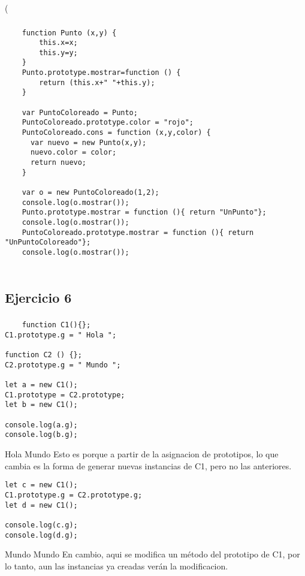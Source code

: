 \left( \documentclass[10pt,a4paper]{article}
\begin{document}
\subsubsection{}
    \begin{lstlisting}
    function Punto (x,y) {
    	this.x=x;
    	this.y=y;
    }
    Punto.prototype.mostrar=function () {
    	return (this.x+" "+this.y);
    }
    
    var PuntoColoreado = Punto;
    PuntoColoreado.prototype.color = "rojo";
    PuntoColoreado.cons = function (x,y,color) {
      var nuevo = new Punto(x,y);
      nuevo.color = color;
      return nuevo;
    }

    var o = new PuntoColoreado(1,2);
    console.log(o.mostrar());
    Punto.prototype.mostrar = function (){ return "UnPunto"};
    console.log(o.mostrar());
    PuntoColoreado.prototype.mostrar = function (){ return "UnPuntoColoreado"};
    console.log(o.mostrar());
    \end{lstlisting}
\subsubsection{}
    \begin{lstlisting}
    \end{lstlisting}
\subsection{Ejercicio 6}
\subsubsection{}
    \begin{lstlisting}
    function C1(){};
C1.prototype.g = " Hola ";

function C2 () {};
C2.prototype.g = " Mundo ";

let a = new C1();
C1.prototype = C2.prototype;
let b = new C1();

console.log(a.g);
console.log(b.g);
    \end{lstlisting}

Hola Mundo
Esto es porque a partir de la asignacion de prototipos, lo que cambia es la forma de generar nuevas instancias de C1, pero no las anteriores.

    \begin{lstlisting}
let c = new C1();
C1.prototype.g = C2.prototype.g;
let d = new C1();

console.log(c.g);
console.log(d.g);
    \end{lstlisting}
Mundo Mundo
En cambio, aqui se modifica un método del prototipo de C1, por lo tanto, aun las instancias ya creadas verán la modificacion.
\end{document}
